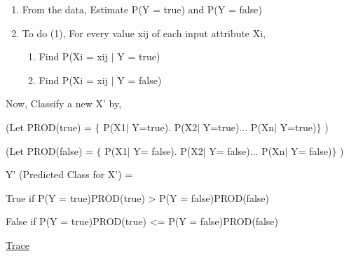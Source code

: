 \documentclass[12pt]{article}
\renewcommand{\_}{\kern-1.5pt\textunderscore\kern-1.5pt}
\begin{document}
\begin{enumerate}
	\item From the data, Estimate P(Y = true) and P(Y = false)\par

	\item To do (1), For every value xij of each input attribute Xi, \par

\begin{enumerate}
	\item Find P(Xi = xij $ \vert $  Y = true)\par

	\item Find P(Xi = xij $ \vert $  Y = false)
\end{enumerate}
\end{enumerate}\par

Now, Classify a new X’ by, \par

(Let PROD(true) = $ \{ $ P(X1$ \vert $ Y=true). P(X2$ \vert $ Y=true)$ \ldots $ P(Xn$ \vert $ Y=true)$ \} $ )\par

(Let PROD(false) = $ \{ $ P(X1$ \vert $ Y= false). P(X2$ \vert $ Y= false)$ \ldots $ P(Xn$ \vert $ Y= false)$ \} $ )\par

Y’ (Predicted Class for X’) = \par

True if P(Y = true)PROD(true) > P(Y = false)PROD(false)\par

False if P(Y = true)PROD(true) <= P(Y = false)PROD(false)\par

{\fontsize{14pt}{16.8pt}\selectfont \uline{Trace}\par}\par



\end{document}
